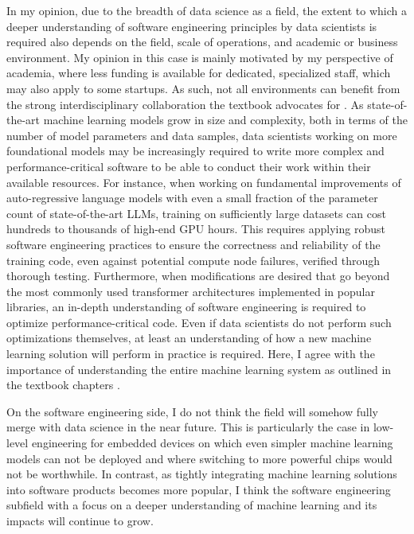 \documentclass[11pt]{article}
\begin{document}
In my opinion, due to the breadth of data science as a field, the extent to which a deeper understanding of software engineering principles by data scientists is required also depends on the field, scale of operations, and academic or business environment. My opinion in this case is mainly motivated by my perspective of academia, where less funding is available for dedicated, specialized staff, which may also apply to some startups. As such, not all environments can benefit from the strong interdisciplinary collaboration the textbook advocates for \parencite{kastner2025machine}. As state-of-the-art machine learning models grow in size and complexity, both in terms of the number of model parameters and data samples, data scientists working on more foundational models may be increasingly required to write more complex and performance-critical software to be able to conduct their work within their available resources. For instance, when working on fundamental improvements of auto-regressive language models with even a small fraction of the parameter count of state-of-the-art LLMs, training on sufficiently large datasets can cost hundreds to thousands of high-end GPU hours. This requires applying robust software engineering practices to ensure the correctness and reliability of the training code, even against potential compute node failures, verified through thorough testing. Furthermore, when modifications are desired that go beyond the most commonly used transformer architectures implemented in popular libraries, an in-depth understanding of software engineering is required to optimize performance-critical code. Even if data scientists do not perform such optimizations themselves, at least an understanding of how a new machine learning solution will perform in practice is required. Here, I agree with the importance of understanding the entire machine learning system as outlined in the textbook chapters \parencite{kastner2025machine}.

On the software engineering side, I do not think the field will somehow fully merge with data science in the near future. This is particularly the case in low-level engineering for embedded devices on which even simpler machine learning models can not be deployed and where switching to more powerful chips would not be worthwhile. In contrast, as tightly integrating machine learning solutions into software products becomes more popular, I think the software engineering subfield with a focus on a deeper understanding of machine learning and its impacts will continue to grow.
\end{document}
